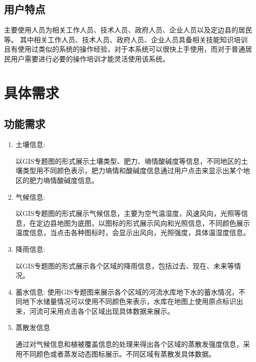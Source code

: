 \subsection{用户特点}

主要使用人员为相关工作人员、技术人员、政府人员、企业人员以及定边县的居民等。
其中相关工作人员、技术人员、政府人员、企业人员具备相关技能知识培训且有使用过类似的系统的操作经验，对于本系统可以很快上手使用，而对于普通居民用户需要进行必要的操作培训才能灵活使用该系统。


%
%

\section{具体需求}

\subsection{功能需求}

\begin{enumerate}
	\item 土壤信息:
	
	以GIS专题图的形式展示土壤类型、肥力、墒情酸碱度等信息，不同地区的土壤类型用不同颜色表示，肥力墒情和酸碱度信息通过用户点击来显示出某个地区的肥力墒情酸碱度信息。
    \item 气候信息:
 
    以GIS专题图的形式展示气候信息，主要为空气温湿度，风速风向，光照等信息，在定边县地图为底图，以图标的形式展示风向和光照信息，不同颜色展示温度信息，当点击各种图标时，会显示出风向，光照强度，具体温湿度信息。
    \item 降雨信息:
    
    以GIS专题图的形式展示各个区域的降雨信息，包括过去、现在、未来等情况。
    \item 蓄水信息:
    使用GIS专题图来展示各个区域的河流水库地下水的蓄水情况，不同地下水储量情况可以使用不同颜色来表示，水库在地图上使用原点标识出来，河流可采用点击各个区域出现具体数据来展示。
    \item{蒸散发信息}
    
    通过对气候信息和植被覆盖信息的处理来得出各个区域的蒸散发强度信息，采用不同颜色或者蒸发动态图标展示。不同区域有蒸散发具体数据。
    
\end{enumerate}

